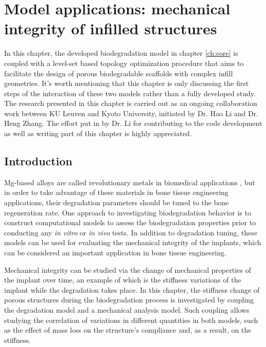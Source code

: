 \chapter{Model applications: mechanical integrity of infilled structures}\label{ch:infill}

In this chapter, the developed biodegradation model in chapter \ref{ch:core} is coupled with a level-set based topology optimization procedure that aims to facilitate the design of porous biodegradable scaffolds with complex infill geometries. It's worth mentioning that this chapter is only discussing the first steps of the interaction of these two models rather than a fully developed study. The research presented in this chapter is carried out as an ongoing collaboration work between KU Leuven and Kyoto University, initiated by Dr. Hao Li and Dr. Heng Zhang. The effort put in by Dr. Li for contributing to the code development as well as writing part of this chapter is highly appreciated.

\section{Introduction}

Mg-based alloys are called revolutionary metals in biomedical applications \cite{Shuai2019}, but in order to take advantage of these materials in bone tissue engineering applications, their degradation parameters should be tuned to the bone regeneration rate. One approach to investigating biodegradation behavior is to construct computational models to assess the biodegradation properties prior to conducting any \textit{in vitro} or \textit{in vivo} tests. In addition to degradation tuning, these models can be used for evaluating the mechanical integrity of the implants, which can be considered an important application in bone tissue engineering.

Mechanical integrity can be studied via the change of mechanical properties of the implant over time, an example of which is the stiffness variations of the implant while the degradation takes place. In this chapter, the stiffness change of porous structures during the biodegradation process is investigated by coupling the degradation model and a mechanical analysis model. Such coupling allows studying the correlation of variations in different quantities in both models, such as the effect of mass loss on the structure's compliance and, as a result, on the stiffness.


